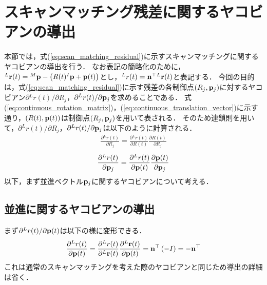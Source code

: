\section{スキャンマッチング残差に関するヤコビアンの導出}
\label{sec:scan_matching}

本節では，式(\ref{eq:scan_matching_residual})に示すスキャンマッチングに関するヤコビアンの導出を行う．
なお表記の簡略化のために，${}^{L}{\bf r}(t) = {}^{M}{\bf p} - \left(R(t) {}^{I}{\bf p} + {\bf p}(t) \right)$とし，${}^{L}r(t) = {\bf n}^{\top} {}^{L}{\bf r}(t)$と表記する．
今回の目的は，式(\ref{eq:scan_matching_residual})に示す残差の各制御点$\left( R_{j}, {\bf p}_{j} \right)$に対するヤコビアン$\partial {}^{L}r(t) / \partial R_{j}$，$\partial {}^{L}r(t) / \partial {\bf p}_{j}$を求めることである．
式(\ref{eq:continuous_rotation_matrix})，(\ref{eq:continuous_translation_vector})に示す通り，$\left( R(t), {\bf p}(t) \right)$は制御点$\left( R_{j}, {\bf p}_{j} \right)$を用いて表される．
そのため連鎖則を用いて，$\partial {}^{L}r(t) / \partial R_{j}$，$\partial {}^{L}r(t) / \partial {\bf p}_{j}$は以下のように計算される．
%
\begin{align}
  \frac{ \partial {}^{L}r(t) }{ \partial R_{j} }
  =
  \frac{ \partial {}^{L}r(t) }{ \partial R(t) }
  \frac{ \partial R(t) }{ \partial R_{j} }  
\end{align}
%
\begin{align}
  \frac{ \partial {}^{L}r(t) }{ \partial {\bf p}_{j} }
  =
  \frac{ \partial {}^{L}r(t) }{ \partial {\bf p}(t) }
  \frac{ \partial {\bf p}(t) }{ \partial {\bf p}_{j} }
\end{align}
%
以下，まず並進ベクトル${\bf p}_{j}$に関するヤコビアンについて考える．




\subsection{並進に関するヤコビアンの導出}

まず$\partial {}^{L}r(t) / \partial {\bf p}(t)$は以下の様に変形できる．
%
\begin{align}
  \frac{ \partial {}^{L}r(t) }{ \partial {\bf p}(t) }
  =
  \frac{ \partial {}^{L}r(t) }{ \partial {}^{L}{\bf r}(t) }
  \frac{ \partial {}^{L}{\bf r}(t) }{ \partial {\bf p}(t) }
  = {\bf n}^{\top} \left( -I \right)
  = -{\bf n}^{\top}
\end{align}
%
これは通常のスキャンマッチングを考えた際のヤコビアンと同じため導出の詳細は省く．

